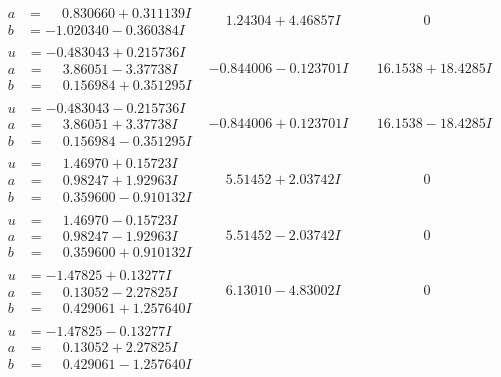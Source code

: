 \documentclass[1p]{elsarticle_modified}
\theoremstyle{definition}
\begin{document}
$$\begin{array}{c|c|c}
\begin{aligned}
a &= \phantom{-}0.830660 + 0.311139 I \\
b &= -1.020340 - 0.360384 I\end{aligned}
 & \phantom{-}1.24304 + 4.46857 I & \phantom{-0.000000 } 0 \\ \hline\begin{aligned}
u &= -0.483043 + 0.215736 I \\
a &= \phantom{-}3.86051 - 3.37738 I \\
b &= \phantom{-}0.156984 + 0.351295 I\end{aligned}
 & -0.844006 - 0.123701 I & \phantom{-}16.1538 + 18.4285 I \\ \hline\begin{aligned}
u &= -0.483043 - 0.215736 I \\
a &= \phantom{-}3.86051 + 3.37738 I \\
b &= \phantom{-}0.156984 - 0.351295 I\end{aligned}
 & -0.844006 + 0.123701 I & \phantom{-}16.1538 - 18.4285 I \\ \hline\begin{aligned}
u &= \phantom{-}1.46970 + 0.15723 I \\
a &= \phantom{-}0.98247 + 1.92963 I \\
b &= \phantom{-}0.359600 - 0.910132 I\end{aligned}
 & \phantom{-}5.51452 + 2.03742 I & \phantom{-0.000000 } 0 \\ \hline\begin{aligned}
u &= \phantom{-}1.46970 - 0.15723 I \\
a &= \phantom{-}0.98247 - 1.92963 I \\
b &= \phantom{-}0.359600 + 0.910132 I\end{aligned}
 & \phantom{-}5.51452 - 2.03742 I & \phantom{-0.000000 } 0 \\ \hline\begin{aligned}
u &= -1.47825 + 0.13277 I \\
a &= \phantom{-}0.13052 - 2.27825 I \\
b &= \phantom{-}0.429061 + 1.257640 I\end{aligned}
 & \phantom{-}6.13010 - 4.83002 I & \phantom{-0.000000 } 0 \\ \hline\begin{aligned}
u &= -1.47825 - 0.13277 I \\
a &= \phantom{-}0.13052 + 2.27825 I \\
b &= \phantom{-}0.429061 - 1.257640 I\end{aligned}

\end{array}$$
\end{document}
